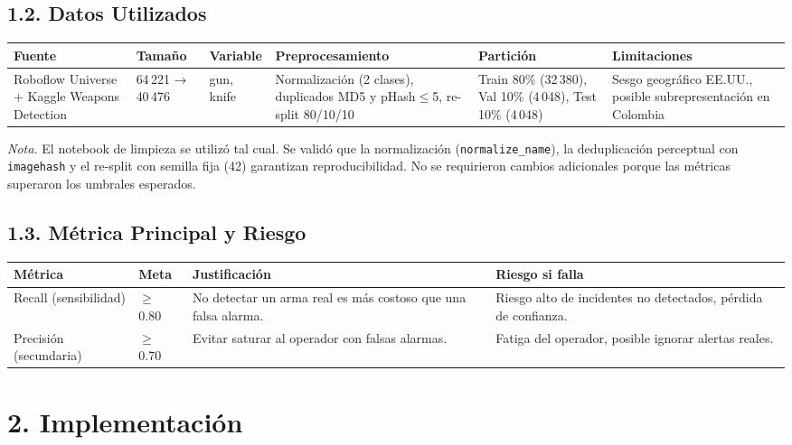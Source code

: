 \documentclass[12pt, letterpaper]{article}
\begin{document}
\subsection{1.2. Datos Utilizados}

\begin{center}
\begin{tabular}{L{2.5cm} L{2cm} L{1.5cm} L{3.5cm} L{2cm} L{2cm}}
\toprule
\textbf{Fuente} & \textbf{Tamaño} & \textbf{Variable} & \textbf{Preprocesamiento} & \textbf{Partición} & \textbf{Limitaciones} \\
\midrule
Roboflow Universe + Kaggle Weapons Detection &
64\,221 → 40\,476 &
gun, knife &
Normalización (2 clases), duplicados MD5 y pHash$\leq$5, re-split 80/10/10 &
Train 80\% (32\,380), Val 10\% (4\,048), Test 10\% (4\,048) &
Sesgo geográfico EE.UU., posible subrepresentación en Colombia \\
\bottomrule
\end{tabular}
\end{center}

\textit{Nota.} El notebook de limpieza se utilizó tal cual. Se validó que la normalización (\texttt{normalize\_name}), la deduplicación perceptual con \texttt{imagehash} y el re-split con semilla fija (42) garantizan reproducibilidad. No se requirieron cambios adicionales porque las métricas superaron los umbrales esperados.

\subsection{1.3. Métrica Principal y Riesgo}

\begin{center}
\begin{tabular}{L{3cm} L{1.5cm} L{4cm} L{4cm}}
\toprule
\textbf{Métrica} & \textbf{Meta} & \textbf{Justificación} & \textbf{Riesgo si falla} \\
\midrule
Recall (sensibilidad) & $\geq$ 0.80 & No detectar un arma real es más costoso que una falsa alarma. & Riesgo alto de incidentes no detectados, pérdida de confianza. \\
Precisión (secundaria) & $\geq$ 0.70 & Evitar saturar al operador con falsas alarmas. & Fatiga del operador, posible ignorar alertas reales. \\
\bottomrule
\end{tabular}
\end{center}

\section{2. Implementación}
\end{document}
